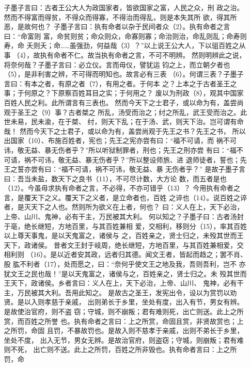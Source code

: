 \documentclass[12pt,UTF8]{ctexbook}
\begin{document}
子墨子言曰：古者王公大人为政国家者，皆欲国家之富，人民之众，刑 
政之治。然而不得富而得贫，不得众而得寡，不得治而得乱，则是本失其所 
欲，得其所恶，是故何也？ 
子墨子言曰：执有命者以杂于民间者众（2）。执有命者之言曰：“命富则 
富，命贫则贫；命众则众，命寡则寡；命治则治，命乱则乱；命寿则寿，命 
夭则夭；命……虽强劲，何益哉（3）？”以上说王公大人，下以驵百姓之从事 
（4），故执有命者不仁。故当执有命者之言，不可不明辨。 
然则明辨此之说，将奈何哉？子墨子言曰：必立仪。言而毋仪，譬犹运 
钧之上，而立朝夕者也（5），是非利害之辨，不可得而明知也。故言必有三表 
（6）。何谓三表？子墨子言曰：有本之者，有原之者（7），有用之者。于何本 
之？上本之于古者圣王之事；于何原之？下原察百姓耳目之实；于何用之？ 
废以为刑政（8），观其中国家百姓人民之利。此所谓言有三表也。 
然而今天下之士君子，或以命为有，盖尝尚观于圣王之（9）事？古者桀之 
所乱，汤受而治之；纣之所乱，武王受而治之。此世未易，民未渝，在于桀、 
纣，则天下乱；在于汤、武，则天下治。岂可谓有命哉！ 
然而今天下之士君子，或以命为有，盖尝尚观于先王之书？先王之书， 
所以出国家（10）、布施百姓者，宪也；先王之宪亦尝有曰：“福不可请，而 
祸不可讳，敬无益、暴无伤者乎？”所以听狱制罪者，刑也；先王之刑亦尝 
有曰：“福不可请，祸不可讳，敬无益、暴无伤者乎？”所以整设师旅、进 
退师徒者，誓也；先王之誓亦尝有曰：“福不可请，祸不可讳，敬无益、暴 
无伤者乎？” 
是故子墨子言曰：吾当未盐，数天下之良书（11），不可尽计数，大方论 
数，而五者是也（12）。今虽毋求执有命者之言，不必得，不亦可错乎（13）？ 
今用执有命者之言，是覆天下之义。覆天下之义者，是立命者也，百姓 
之谇也（14）。说百姓之谇者，是灭天下之人也。然则所为欲义在上者，何也？ 
曰：义人在上，天下必治，上帝、山川、鬼神，必有干主，万民被其大利。 
何以知之？子墨子曰：古者汤封于亳，绝长继短，方地百里，与其百姓兼相 
爱，交相利，移则分（15），率其百姓以上尊天事鬼，是以天鬼富之，诸侯与 
之，百姓亲之，贤士归之，未殁其世而王天下，政诸侯。 
昔者文王封于岐周，绝长继短，方地百里，与其百姓兼相爱，交相利则 
（16）。是以近者安其政，远者归其德。闻文王者，皆起而趋之；罢不肖、股 
肱不利者（17），处而愿之，曰：“奈何乎使文王之地及我，吾则吾利，岂不 
亦犹文王之民也哉！”是以天鬼富之，诸侯与之，百姓亲之，贤士归之。未 
殁其世而王天下，政诸侯。乡者言曰：义人在上，天下必治，上帝、山川、 
鬼神，必有干主，万民被其大利。吾用此知之。 
是故古之圣王，发宪出令，设以为赏罚以劝贤。是以入则孝慈于亲戚， 
出则弟长于乡里，坐处有度，出入有节，男女有辨。是故使治官府，则不盗 
窃；守城，则不崩叛；君有难则死，出亡则送。此上之所赏，而百姓之所誉 
也。执有命者之言曰：上之所赏，命固且赏，非贤故赏也；上之所罚，命固 
且罚，不暴故罚也。是故入则不慈孝于亲戚，出则不弟长于乡里，坐处不度， 
出入无节，男女无辨。是故治官府，则盗窃；守城，则崩叛；君有难则不死， 
出亡则不送。此上之所罚，百姓之所非毁也。执有命者言曰：上之所罚，命 
\end{document}
